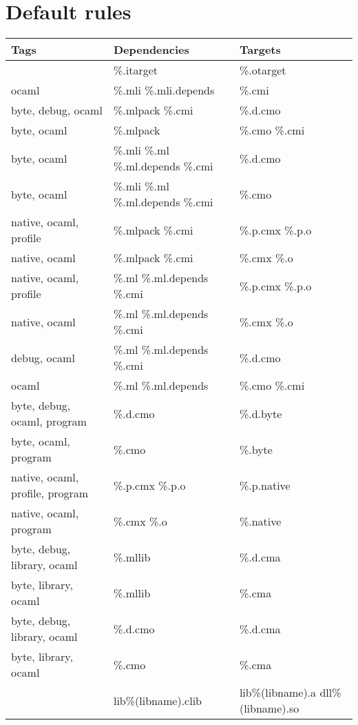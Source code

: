 \documentclass[9pt]{article}
\begin{document}
\section{Default rules}
\begin{center}
\small
\begin{tabular}{|l|l|p{5cm}|}
  \hline
   \textbf{Tags} & \textbf{Dependencies} & \textbf{Targets} \\
  \hline
  \hline
   &  \%.itarget  &  \%.otarget  \\
  \hline
   ocaml &  \%.mli \%.mli.depends  &  \%.cmi  \\
  \hline
   byte, debug, ocaml &  \%.mlpack \%.cmi &  \%.d.cmo  \\
  \hline
   byte, ocaml &  \%.mlpack  &  \%.cmo \%.cmi  \\
  \hline
   byte, ocaml &  \%.mli \%.ml \%.ml.depends \%.cmi  & \%.d.cmo  \\
  \hline
   byte, ocaml &  \%.mli \%.ml \%.ml.depends \%.cmi  & \%.cmo  \\
  \hline
   native, ocaml, profile & \%.mlpack \%.cmi  &  \%.p.cmx \%.p.o  \\
  \hline
   native, ocaml &  \%.mlpack \%.cmi &  \%.cmx \%.o  \\
  \hline
   native, ocaml, profile &  \%.ml \%.ml.depends \%.cmi  & \%.p.cmx \%.p.o  \\
  \hline
   native, ocaml &  \%.ml \%.ml.depends \%.cmi  & \%.cmx \%.o  \\
  \hline
   debug, ocaml &  \%.ml \%.ml.depends \%.cmi  & \%.d.cmo  \\
  \hline
   ocaml &  \%.ml \%.ml.depends  &  \%.cmo \%.cmi  \\
  \hline
   byte, debug, ocaml, program &  \%.d.cmo  &  \%.d.byte \\
  \hline
   byte, ocaml, program &  \%.cmo  &  \%.byte  \\
  \hline
   native, ocaml, profile, program &  \%.p.cmx \%.p.o  & \%.p.native  \\
  \hline
   native, ocaml, program &  \%.cmx \%.o  & \%.native  \\
  \hline
   byte, debug, library, ocaml &  \%.mllib  & \%.d.cma  \\
  \hline
   byte, library, ocaml &  \%.mllib  &  \%.cma  \\
  \hline
   byte, debug, library, ocaml &  \%.d.cmo  &  \%.d.cma  \\
  \hline
   byte, library, ocaml &  \%.cmo  &  \%.cma  \\
  \hline
    & lib\%(libname).clib & lib\%(libname).a dll\%(libname).so  \\

\end{tabular}
\end{center}
\end{document}
